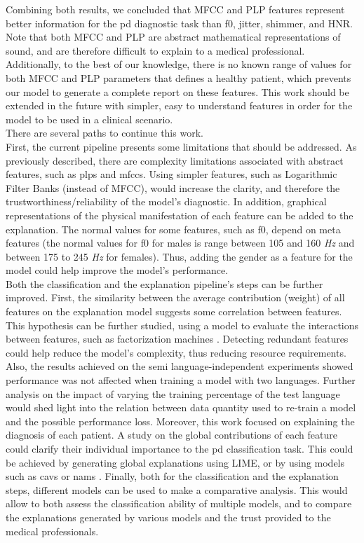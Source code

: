 Combining both results, we concluded that MFCC and PLP features represent better information for the \gls{pd} diagnostic task than \gls{f0}, jitter, shimmer, and HNR. Note that both MFCC and PLP are abstract mathematical representations of sound, and are therefore difficult to explain to a medical professional. Additionally, to the best of our knowledge, there is no known range of values for both MFCC and PLP parameters that defines a healthy patient, which prevents our model to generate a complete report on these features. This work should be extended in the future with simpler, easy to understand features in order for the model to be used in a clinical scenario. \\
There are several paths to continue this work. \\
First, the current pipeline presents some limitations that should be addressed. As previously described, there are complexity limitations associated with abstract features, such as \gls{plp}s and \gls{mfcc}s. Using simpler features, such as Logarithmic Filter Banks \cite{logfilterbank} (instead of MFCC), would increase the clarity, and therefore the trustworthiness/reliability of the model's diagnostic. In addition, graphical representations of the physical manifestation of each feature can be added to the explanation. The normal values for some features, such as \gls{f0}, depend on meta features (the normal values for \gls{f0} for males is range between 105 and 160 \textit{Hz} and between 175 to 245 \textit{Hz} for females). Thus, adding the gender as a feature for the model could help improve the model's performance. \\
Both the classification and the explanation pipeline's steps can be further improved. First, the similarity between the average contribution (weight) of all features on the explanation model suggests some correlation between features. This hypothesis can be further studied, using a model to evaluate the interactions between features, such as factorization machines \cite{factorizationmachines}. Detecting redundant features could help reduce the model's complexity, thus reducing resource requirements. Also, the results achieved on the semi language-independent experiments showed performance was not affected when training a model with two languages. Further analysis on the impact of varying the training percentage of the test language would shed light into the relation between data quantity used to re-train a model and the possible performance loss. Moreover, this work focused on explaining the diagnosis of each patient. A study on the global contributions of each feature could clarify their individual importance to the \gls{pd} classification task. This could be achieved by generating global explanations using LIME, or by using models such as \gls{cav}s \cite{TCAV} or \gls{nam}s \cite{NAM}. Finally, both for the classification and the explanation steps, different models can be used to make a comparative analysis. This would allow to both assess the classification ability of multiple models, and to compare the explanations generated by various models and the trust provided to the medical professionals. \\
